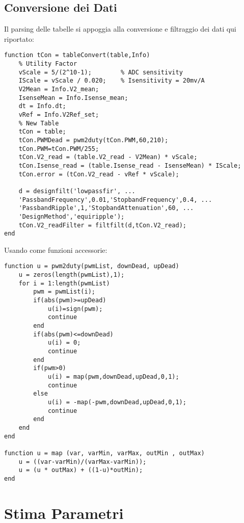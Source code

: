 \subsection{Conversione dei Dati}
Il parsing delle tabelle si appoggia alla conversione e filtraggio dei dati qui riportato:
\begin{lstlisting}[style=matlabStyle,caption={Parsing delle tabelle},label=lst:dataFilter]
function tCon = tableConvert(table,Info)
	% Utility Factor
	vScale = 5/(2^10-1);        % ADC sensitivity
	IScale = vScale / 0.020;    % Isensitivity = 20mv/A
	V2Mean = Info.V2_mean;
	IsenseMean = Info.Isense_mean;
	dt = Info.dt;
	vRef = Info.V2Ref_set;
	% New Table
	tCon = table;
	tCon.PWMDead = pwm2duty(tCon.PWM,60,210);
	tCon.PWM=tCon.PWM/255;
	tCon.V2_read = (table.V2_read - V2Mean) * vScale;
	tCon.Isense_read = (table.Isense_read - IsenseMean) * IScale;
	tCon.error = (tCon.V2_read - vRef * vScale);
	
	d = designfilt('lowpassfir', ...
	'PassbandFrequency',0.01,'StopbandFrequency',0.4, ...
	'PassbandRipple',1,'StopbandAttenuation',60, ...
	'DesignMethod','equiripple');
	tCon.V2_readFilter = filtfilt(d,tCon.V2_read);
end
\end{lstlisting}
 Usando come funzioni accessorie:
\begin{lstlisting}[style=matlabStyle,caption={Parsing delle tabelle},label=lst:deadzoneRemove] 
function u = pwm2duty(pwmList, downDead, upDead)
	u = zeros(length(pwmList),1);
	for i = 1:length(pwmList)
		pwm = pwmList(i);
		if(abs(pwm)>=upDead)
			u(i)=sign(pwm);
			continue
		end
		if(abs(pwm)<=downDead)
			u(i) = 0;
			continue
		end
		if(pwm>0)
			u(i) = map(pwm,downDead,upDead,0,1);
			continue
		else
			u(i) = -map(-pwm,downDead,upDead,0,1);
			continue
		end
	end
end

function u = map (var, varMin, varMax, outMin , outMax)
	u = ((var-varMin)/(varMax-varMin));
	u = (u * outMax) + ((1-u)*outMin);
end
\end{lstlisting}


\section{Stima Parametri}

